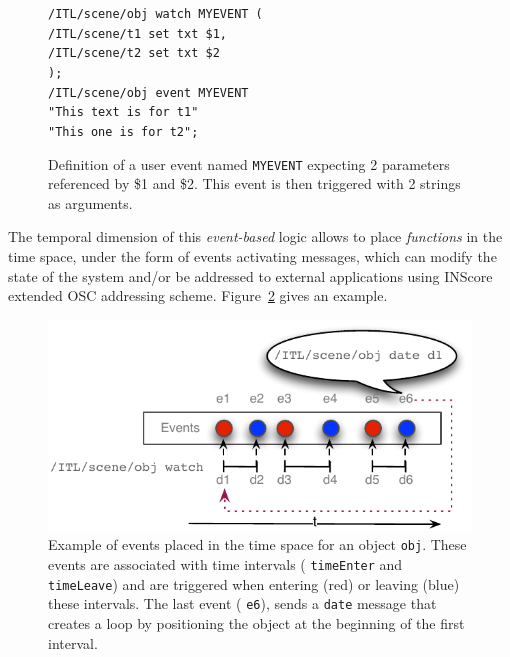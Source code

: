 \documentclass{article}
\newcommand{\OSC}[1]	{{\fontsize{8.5pt}{8pt} \selectfont\texttt{#1}}}
\newcommand{\tab}{\hspace*{4mm}}
\newcommand{\sample}[1]		{\vspace{-0.2em}\begin{center}\colorbox{mygrey}{\begin{minipage}[t]{0.98\columnwidth} {\small \texttt{#1}}\end{minipage}}\end{center}}
\begin{document}
\begin{figure}[h]
   \centering
   \sample{/ITL/scene/obj watch MYEVENT ( \\
\tab/ITL/scene/t1 set txt \$1, \\
\tab/ITL/scene/t2 set txt \$2 \\
);   \\   
/ITL/scene/obj event MYEVENT \\
\hspace*{25mm}"This text is for t1"\\
\hspace*{25mm}"This one is for t2"; 
}
   \caption{Definition of a user event named \OSC{MYEVENT} expecting 2 parameters referenced by \$1 and \$2. This event is then triggered with 2 strings as arguments.}
   \label{fig:uevent}
\end{figure}

The temporal dimension of this \emph{event-based} logic allows to place \emph{functions} in the time space, under the form of events 
activating messages, which can modify the state of the system and/or be addressed to external applications using INScore extended OSC addressing scheme. Figure~\ref{fig:events} gives an example. %
  
\begin{figure}[h]
   \centering
   \includegraphics[width=0.95\columnwidth]{imgs/events}
   \caption{Example of events placed in the time space for an object \OSC{obj}. These events are associated with time intervals (\OSC{timeEnter} and \OSC{timeLeave}) and are triggered when entering (red) or leaving (blue) these intervals. The last event (\OSC{e6}), sends a \OSC{date} message that creates a loop by positioning the object at the beginning of the first interval.}
   \label{fig:events}
\end{figure}
\end{document}
